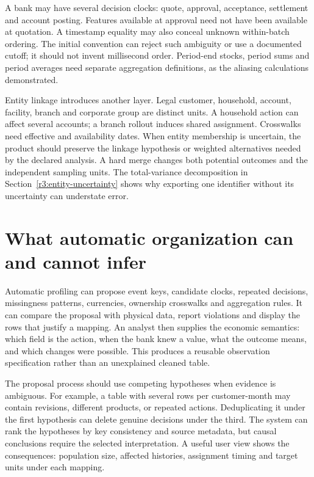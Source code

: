 A bank may have several decision clocks: quote, approval, acceptance,
settlement and account posting. Features available at approval need not
have been available at quotation. A timestamp equality may also conceal
unknown within-batch ordering. The initial convention can reject such
ambiguity or use a documented cutoff; it should not invent millisecond
order. Period-end stocks, period sums and period averages need separate
aggregation definitions, as the aliasing calculations demonstrated.

Entity linkage introduces another layer. Legal customer, household,
account, facility, branch and corporate group are distinct units. A
household action can affect several accounts; a branch rollout induces
shared assignment. Crosswalks need effective and availability dates.
When entity membership is uncertain, the product should preserve the
linkage hypothesis or weighted alternatives needed by the declared
analysis. A hard merge changes both potential outcomes and the
independent sampling units. The total-variance decomposition in
Section~\ref{r3:entity-uncertainty} shows why exporting one identifier
without its uncertainty can understate error.

\section{What automatic organization can and cannot infer}
\label{r3:automatic-organization}

Automatic profiling can propose event keys, candidate clocks, repeated
decisions, missingness patterns, currencies, ownership crosswalks and
aggregation rules. It can compare the proposal with physical data,
report violations and display the rows that justify a mapping.
An analyst then supplies the economic semantics: which field is the
action, when the bank knew a value, what the outcome means, and which
changes were possible. This produces a reusable observation specification
rather than an unexplained cleaned table.

The proposal process should use competing hypotheses when evidence is
ambiguous. For example, a table with several rows per customer-month may
contain revisions, different products, or repeated actions. Deduplicating
it under the first hypothesis can delete genuine decisions under the
third. The system can rank the hypotheses by key consistency and source
metadata, but causal conclusions require the selected interpretation.
A useful user view shows the consequences: population size, affected
histories, assignment timing and target units under each mapping.


